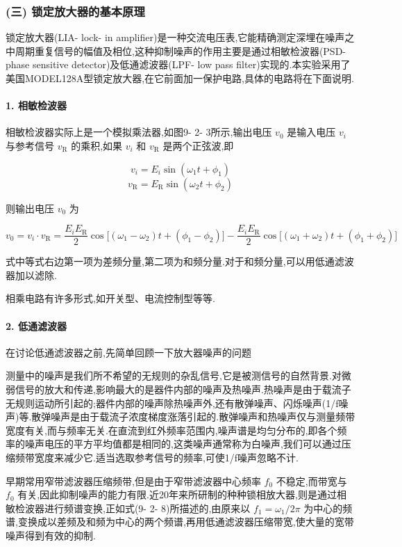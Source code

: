 \documentclass[12pt,a4paper]{article}
\begin{document}
\subsubsection*{(三) 锁定放大器的基本原理}

锁定放大器(LIA- lock- in amplifier)是一种交流电压表,它能精确测定深埋在噪声之中周期重复信号的幅值及相位,这种抑制噪声的作用主要是通过相敏检波器(PSD- phase sensitive detector)及低通滤波器(LPF- low pass filter)实现的.本实验采用了美国MODEL128A型锁定放大器,在它前面加一保护电路,具体的电路将在下面说明.

\paragraph{1. 相敏检波器}

相敏检波器实际上是一个模拟乘法器,如图9- 2- 3所示,输出电压 \(v_{0}\) 是输入电压 \(v_{i}\) 与参考信号 \(v_{\mathrm{R}}\) 的乘积,如果 \(v_{i}\) 和 \(v_{\mathrm{R}}\) 是两个正弦波,即

\[
v_{i} = E_{i}\sin (\omega_{1}t + \phi_{1})
\]
\[
v_{\mathrm{R}} = E_{\mathrm{R}}\sin (\omega_{2}t + \phi_{2})
\]

则输出电压 \(v_{0}\) 为

\[
v_{0}=v_{i}\cdot v_{\mathrm{R}}=\frac{E_{i}E_{\mathrm{R}}}{2}\cos\big[(\omega_{1}-\omega_{2})t+(\phi_{1}-\phi_{2})\big]-\frac{E_{i}E_{\mathrm{R}}}{2}\cos\big[(\omega_{1}+\omega_{2})t+(\phi_{1}+\phi_{2})\big]
\]

式中等式右边第一项为差频分量,第二项为和频分量.对于和频分量,可以用低通滤波器加以滤除.

相乘电路有许多形式,如开关型、电流控制型等等.

\paragraph{2. 低通滤波器}

在讨论低通滤波器之前,先简单回顾一下放大器噪声的问题

测量中的噪声是我们所不希望的无规则的杂乱信号,它是被测信号的自然背景.对微弱信号的放大和传递,影响最大的是器件内部的噪声及热噪声.热噪声是由于载流子无规则运动所引起的;器件内部的噪声除热噪声外,还有散弹噪声、闪烁噪声(1/f噪声)等.散弹噪声是由于载流子浓度梯度涨落引起的.散弹噪声和热噪声仅与测量频带宽度有关,而与频率无关.在直流到红外频率范围内,噪声谱是均匀分布的,即各个频率的噪声电压的平方平均值都是相同的,这类噪声通常称为白噪声,我们可以通过压缩频带宽度来减少它.适当选取参考信号的频率,可使1/f噪声忽略不计.

早期常用窄带滤波器压缩频带,但是由于窄带滤波器中心频率 \(f_{0}\) 不稳定,而带宽与 \(f_{0}\) 有关,因此抑制噪声的能力有限.近20年来所研制的种种锁相放大器,则是通过相敏检波器进行频谱变换,正如式(9- 2- 8)所描述的,由原来以 \(f_{1} = \omega_{1} / 2\pi\) 为中心的频谱,变换成以差频及和频为中心的两个频谱,再用低通滤波器压缩带宽,使大量的宽带噪声得到有效的抑制.
\end{document}
